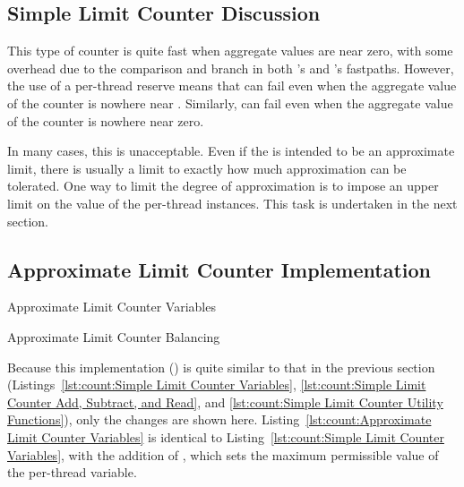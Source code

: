 \subsection{Simple Limit Counter Discussion}
\label{sec:count:Simple Limit Counter Discussion}

This type of counter is quite fast when aggregate values are near zero,
with some overhead due to the comparison and branch in both
's and 's fastpaths.
However, the use of a per-thread  reserve means that
 can fail even when
the aggregate value of the counter is nowhere near .
Similarly,  can fail
even when the aggregate value of the counter is nowhere near zero.

In many cases, this is unacceptable.
Even if the  is intended to be an approximate limit,
there is usually a limit to exactly how much approximation can be tolerated.
One way to limit the degree of approximation is to impose an upper limit
on the value of the per-thread  instances.
This task is undertaken in the next section.

\subsection{Approximate Limit Counter Implementation}
\label{sec:count:Approximate Limit Counter Implementation}
\NoIndentAfterThis

\begin{listing}[tbp]

\caption{Approximate Limit Counter Variables}
\label{lst:count:Approximate Limit Counter Variables}
\end{listing}

\begin{listing}[tbp]

\caption{Approximate Limit Counter Balancing}
\label{lst:count:Approximate Limit Counter Balancing}
\end{listing}

Because this implementation () is quite similar to
that in the previous section
(Listings~\ref{lst:count:Simple Limit Counter Variables},
\ref{lst:count:Simple Limit Counter Add, Subtract, and Read}, and
\ref{lst:count:Simple Limit Counter Utility Functions}),
only the changes are shown here.
Listing~\ref{lst:count:Approximate Limit Counter Variables}
is identical to
Listing~\ref{lst:count:Simple Limit Counter Variables},
with the addition of , which sets the maximum
permissible value of the per-thread  variable.

